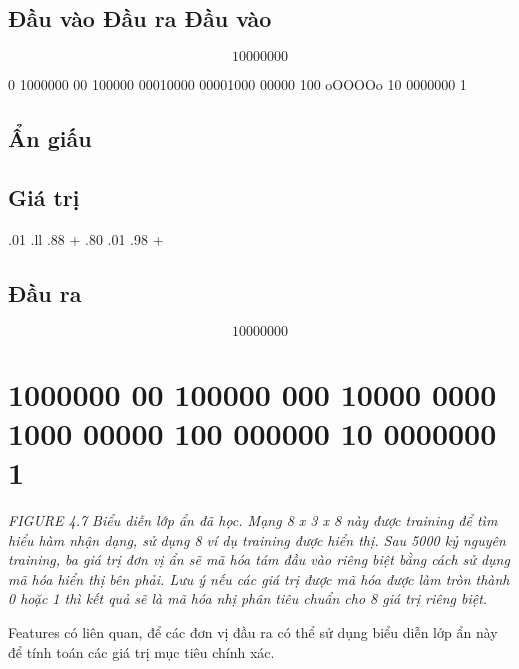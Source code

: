 \subsection{Đầu vào Đầu ra Đầu vào}

\[10000000\]

0 1000000 00 100000 00010000 00001000 00000 100 oOOOOo 10 0000000 1

\subsection{Ẩn giấu}

\subsection{Giá trị}

.01 .ll .88 + .80 .01 .98 +

\subsection{Đầu ra}

\[10000000\]

\section{1000000 00 100000 000 10000 0000 1000 00000 100 000000 10 0000000 1}

\noindent\textit{FIGURE 4.7 Biểu diễn lớp ẩn đã học. Mạng 8 x 3 x 8 này được training để tìm hiểu hàm nhận dạng, sử dụng 8 ví dụ training được hiển thị. Sau 5000 kỷ nguyên training, ba giá trị đơn vị ẩn sẽ mã hóa tám đầu vào riêng biệt bằng cách sử dụng mã hóa hiển thị bên phải. Lưu ý nếu các giá trị được mã hóa được làm tròn thành 0 hoặc 1 thì kết quả sẽ là mã hóa nhị phân tiêu chuẩn cho 8 giá trị riêng biệt.}

Features có liên quan, để các đơn vị đầu ra có thể sử dụng biểu diễn lớp ẩn này để tính toán các giá trị mục tiêu chính xác.

